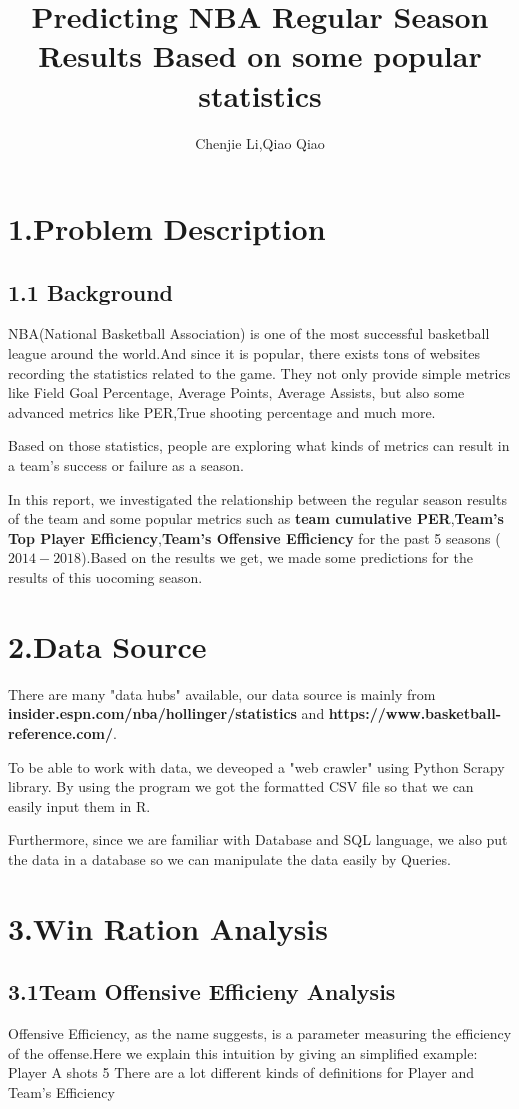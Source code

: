 \documentclass[11pt]{article}
\begin{document}
\title{Predicting NBA Regular Season Results Based on some popular statistics}
\author{Chenjie Li,Qiao Qiao}
\maketitle
\section*{1.Problem Description}
\subsection*{1.1 Background}
\hspace{1.5em}NBA(National Basketball Association) is one of the most successful basketball league around the world.And since it is popular, there exists tons of websites recording the statistics related to the game. They not only provide simple metrics like Field Goal Percentage,  Average Points, Average Assists, but also some advanced metrics like PER,True shooting percentage and much more.

Based on those statistics, people are exploring what kinds of metrics can result in a team's success or failure as a season.

In this report, we investigated the relationship between the regular season results of the team and some popular metrics such as \textbf{team cumulative PER},\textbf{Team's Top Player Efficiency},\textbf{Team's Offensive Efficiency} for the past 5 seasons ($2014-2018$).Based on the results we get, we made some predictions for the results of this uocoming season.

\section*{2.Data Source}
\hspace{1.5em}There are many "data hubs" available, our data source is mainly from \textbf{insider.espn.com/nba/hollinger/statistics} and \textbf{https://www.basketball-reference.com/}.

To be able to work with data, we deveoped a "web crawler" using Python Scrapy library. By using the program we got the formatted CSV file so that we can easily input them in R.

Furthermore, since we are familiar with Database and SQL language, we also put the data in a database so we can manipulate the data easily by Queries.
\section*{3.Win Ration Analysis}
\subsection*{3.1Team Offensive Efficieny Analysis}
\hspace{1.5em}Offensive Efficiency, as the name suggests, is a parameter measuring the efficiency of the offense.Here we explain this intuition by giving an simplified example:
\hspace{1.5em} Player A shots 5 
There are a lot different kinds of definitions for Player and Team's Efficiency 
\end{document}
